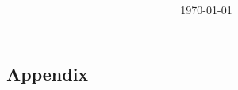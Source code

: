 \documentclass[a4paper,11pt]{article}					%
\title{\Huge\bf\vspace{7cm} }
\author{}
\date{\today}
\begin{document}
\maketitle
\newpage

\parskip=3mm
\tableofcontents
\newpage

\parskip=0mm
\parindent=15mm





\newpage

% 

\begin{thebibliography}{}
\parskip=3mm
\end{thebibliography}

\begin{appendices}
 \newpage
 \section{Appendix}
\end{appendices}
\end{document}

